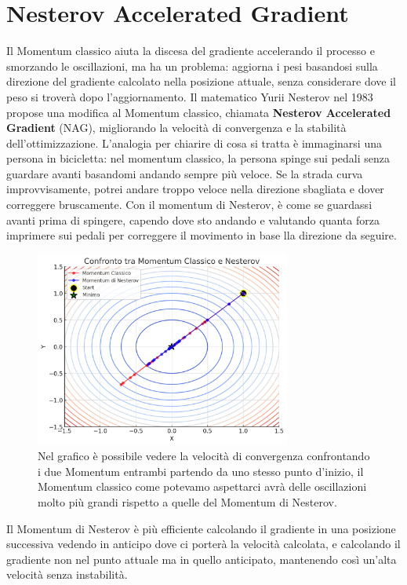 \section{Nesterov Accelerated Gradient}
Il Momentum classico aiuta la discesa del gradiente accelerando il processo e smorzando le oscillazioni, ma ha un problema: aggiorna i pesi basandosi sulla direzione del gradiente calcolato nella posizione attuale, senza considerare dove il peso si troverà dopo l'aggiornamento. Il matematico Yurii Nesterov nel 1983 propose una modifica al Momentum classico, chiamata \textbf{Nesterov Accelerated Gradient} (NAG), migliorando la velocità di convergenza e la stabilità dell’ottimizzazione. L'analogia per chiarire di cosa si tratta è immaginarsi una persona in bicicletta: nel momentum classico, la persona spinge sui pedali senza guardare avanti basandomi andando sempre più veloce. Se la strada curva improvvisamente, potrei andare troppo veloce nella direzione sbagliata e dover correggere bruscamente. Con il momentum di Nesterov, è come se guardassi avanti prima di spingere, capendo dove sto andando e valutando quanta forza imprimere sui pedali per correggere il movimento in base lla direzione da seguire.
\begin{figure}
    \centering
    \includegraphics[width=0.75\textwidth]{figure/momenest.png}
    \caption{Nel grafico è possibile vedere la velocità di convergenza confrontando i due Momentum entrambi partendo da uno stesso punto d'inizio, il Momentum classico come potevamo aspettarci avrà delle oscillazioni molto più grandi rispetto a quelle del Momentum di Nesterov.}
    \label{fig:MomentumVS}
\end{figure}
Il Momentum di Nesterov è più efficiente calcolando il gradiente in una posizione successiva vedendo in anticipo dove ci porterà la velocità calcolata, e calcolando il gradiente non nel punto attuale ma in quello anticipato, mantenendo così un'alta velocità senza instabilità.

